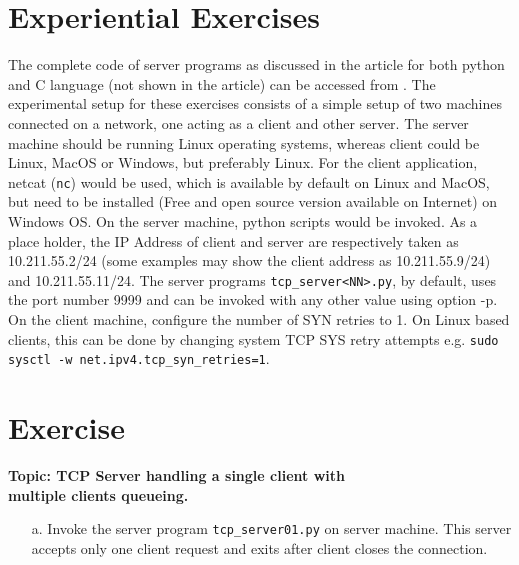 \begin{multicols}{2}
\vspace{-.3cm}

\section{Experiential Exercises}

\vspace{-.2cm}

The complete code of server programs as discussed in the article for both python and C language (not shown in the article) can be accessed from \cite{art1-key17}. The experimental setup for these exercises consists of a simple setup of two machines connected on a network, one acting as a client and other server. The server machine should be running Linux operating systems, whereas client could be Linux, MacOS or Windows, but preferably Linux. For the client application, netcat (\texttt{nc}) \cite{art1-key18} would be used, which is available by default on Linux and MacOS, but need to be installed (Free and open source version available on Internet) on Windows OS. On the server machine, python scripts would be invoked. As a place holder, the IP Address of client and server are respectively taken as 10.211.55.2/24 (some examples may show the client address as 10.211.55.9/24) and 10.211.55.11/24. The server programs \texttt{tcp\_server<NN>.py}, by default, uses the port number 9999 and can be invoked with any other value using option -p. On the client machine, configure the number of SYN retries to 1. On Linux based clients, this can be done by changing system TCP SYS retry attempts e.g. \texttt{sudo sysctl -w  net.ipv4.tcp\_syn\_retries=1}.

\vspace{-.3cm}

\setcounter{section}{0}
\section*{Exercise \label{chap1-exe01}}

\vspace{-.2cm}

\textbf{Topic: TCP Server handling a single client with\\ multiple clients queueing.}

\vspace{-.2cm}

\begin{itemize}
\item[a.] Invoke the server program \texttt{tcp\_server01.py} on server machine. This server accepts only one client request and exits after client closes the connection.


\end{itemize}
\end{multicols}
